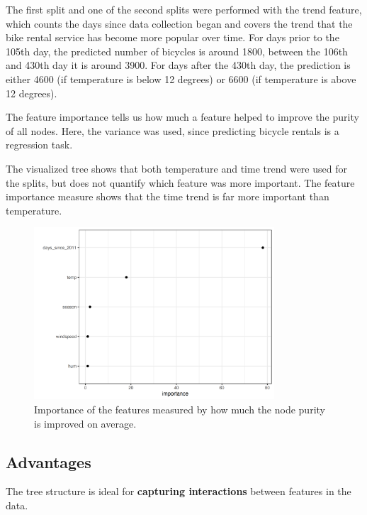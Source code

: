 \documentclass[
  11pt,
]{scrbook}
\begin{document}
The first split and one of the second splits were performed with the trend feature, which counts the days since data collection began and covers the trend that the bike rental service has become more popular over time.
For days prior to the 105th day, the predicted number of bicycles is around 1800, between the 106th and 430th day it is around 3900.
For days after the 430th day, the prediction is either 4600 (if temperature is below 12 degrees) or 6600 (if temperature is above 12 degrees).

The feature importance tells us how much a feature helped to improve the purity of all nodes.
Here, the variance was used, since predicting bicycle rentals is a regression task.

The visualized tree shows that both temperature and time trend were used for the splits, but does not quantify which feature was more important.
The feature importance measure shows that the time trend is far more important than temperature.

\begin{figure}

{\centering \includegraphics[width=0.8\textwidth]{images/tree-importance-1} 

}

\caption{Importance of the features measured by how much the node purity is improved on average.}\label{fig:tree-importance}
\end{figure}

\hypertarget{advantages-2}{%
\subsection{Advantages}\label{advantages-2}}

The tree structure is ideal for \textbf{capturing interactions} between features in the data.
\end{document}
